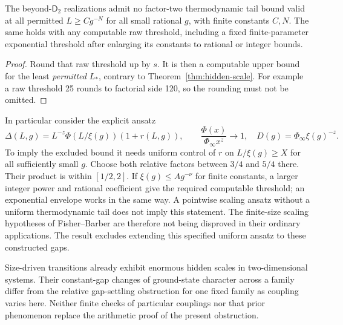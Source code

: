 \begin{corollary}
\label{cor:uniform-scaling}
The beyond-$\mathsf D_2$ realizations admit no factor-two
thermodynamic tail bound valid at all permitted
$L\geq Cg^{-N}$ for all small rational $g$, with finite constants
$C,N$. The same holds with any computable raw threshold, including
a fixed finite-parameter exponential threshold after enlarging its
constants to rational or integer bounds.
\end{corollary}
\begin{proof}
Round that raw threshold up by $s$. It is then a computable upper
bound for the least \emph{permitted} $L_*$, contrary to
Theorem~\ref{thm:hidden-scale}. For example a raw threshold 25
rounds to factorial side 120, so the rounding must not be omitted.
\end{proof}
In particular consider the explicit ansatz
\[
 \Delta(L,g)=L^{-z}\Phi(L/\xi(g))(1+r(L,g)),\qquad
 \frac{\Phi(x)}{\Phi_\infty x^z}\longrightarrow1,
 \quad D(g)=\Phi_\infty\xi(g)^{-z}.
\]
To imply the excluded bound it needs uniform control of $r$ on
$L/\xi(g)\geq X$ for all sufficiently small $g$. Choose both
relative factors between $3/4$ and $5/4$ there. Their product is
within $[1/2,2]$. If $\xi(g)\leq Ag^{-\nu}$ for finite constants,
a larger integer power and rational coefficient give the required
computable threshold; an exponential envelope works in the same way.
A pointwise scaling ansatz without a uniform thermodynamic tail
does not imply this statement. The finite-size scaling hypotheses of
Fisher--Barber \cite{fisherBarber} are therefore not being disproved
in their ordinary applications. The result excludes extending this
specified uniform ansatz to these constructed gaps.

Size-driven transitions \cite{sizeDriven} already exhibit enormous
hidden scales in two-dimensional systems. Their constant-gap changes
of ground-state character across a family differ from the relative
gap-settling obstruction for one fixed family as coupling varies
here. Neither finite checks of particular couplings nor that prior
phenomenon replace the arithmetic proof of the present obstruction.

